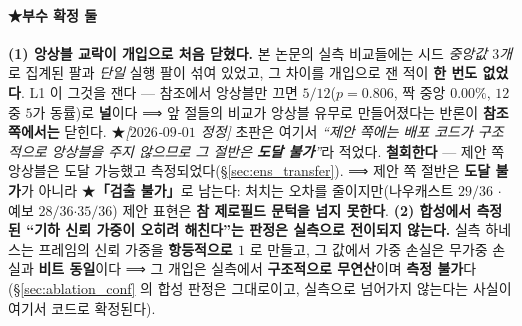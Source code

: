 \documentclass[11pt]{report}
\numberwithin{equation}{chapter}
\numberwithin{figure}{chapter}
\numberwithin{table}{chapter}
\begin{document}
\paragraph{★부수 확정 둘}
\textbf{(1) 앙상블 교락이 개입으로 처음 닫혔다.} 본 논문의 실측 비교들에는 시드
\emph{중앙값 $3$개}로 집계된 팔과 \emph{단일} 실행 팔이 섞여 있었고, 그 차이를 개입으로
잰 적이 \textbf{한 번도 없었다}. L1 이 그것을 잰다 --- 참조에서 앙상블만 끄면
\textbf{$5/12$}($p = 0.806$, 짝 중앙 $0.00\%$, $12$ 중 $5$가 동률)로 \textbf{널}이다
⟹ 앞 절들의 비교가 앙상블 유무로 만들어졌다는 반론이 \textbf{참조 쪽에서는} 닫힌다.
★\emph{[$2026$-$09$-$01$ 정정]} 초판은 여기서 \emph{``제안 쪽에는 배포 코드가 구조적으로
앙상블을 주지 않으므로 그 절반은 \textbf{도달 불가}''}라 적었다. \textbf{철회한다} ---
제안 쪽 앙상블은 도달 가능했고 측정되었다(\S\ref{sec:ens_transfer}).
⟹ 제안 쪽 절반은 \textbf{도달 불가}가 아니라 ★\textbf{「검출 불가」}로 남는다: 처치는
오차를 줄이지만(나우캐스트 $29/36$ $\cdot$ 예보 $28/36$$\cdot$$35/36$) 제안 표현은
\textbf{참 제로필드 문턱을 넘지 못한다}.
\textbf{(2) 합성에서 측정된 ``기하 신뢰 가중이 오히려 해친다''는 판정은 실측으로
전이되지 않는다.} 실측 하네스는 프레임의 신뢰 가중을 \textbf{항등적으로 $1$} 로 만들고,
그 값에서 가중 손실은 무가중 손실과 \textbf{비트 동일}이다 ⟹ 그 개입은 실측에서
\textbf{구조적으로 무연산}이며 \textbf{측정 불가}다(\S\ref{sec:ablation_conf} 의 합성
판정은 그대로이고, 실측으로 넘어가지 않는다는 사실이 여기서 코드로 확정된다).
\end{document}
